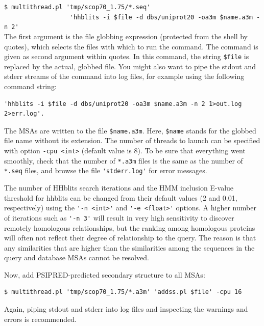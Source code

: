 \documentclass[11pt,a4paper]{article}
\begin{document}
\verb`$ multithread.pl 'tmp/scop70_1.75/*.seq' `\\
\verb`                  'hhblits -i $file -d dbs/uniprot20 -oa3m $name.a3m -n 2'`\\[-1mm]

The first argument is the file globbing expression (protected from the shell by quotes), which selects the files with which to run the command. The command is given as second argument within quotes. In this command, the string \verb`$file` is replaced by the actual, globbed file. You might also want to pipe the stdout and stderr streams of the command into log files, for example using the following command string:
{
\begin{verbatim}
'hhblits -i $file -d dbs/uniprot20 -oa3m $name.a3m -n 2 1>out.log 2>err.log'.
\end{verbatim}
}
The MSAs are written to the file \verb`$name.a3m`. Here, \verb`$name` stands for the globbed file name without its extension. The number of threads to launch can be specified with option \verb`-cpu <int>` (default value is 8). To be sure that everything went smoothly, check that the number of \verb`*.a3m` files is the same as the number of \verb`*.seq` files, and browse the file \verb`'stderr.log'` for error messages. 

The number of HHblits search iterations and the HMM inclusion E-value threshold for hhblits can be changed from their default values (2 and 0.01, respectively) using the \verb`'-n <int>'` and \verb`'-e <float>'` options. A higher number of iterations such as  \verb`'-n 3'` will result in very high sensitivity to discover remotely homologous relationships, but the ranking among homologous proteins will often not reflect their degree of relationship to the query. The reason is that any similarities that are higher than the similarities among the sequences in the query and database MSAs cannot be resolved. 

Now, add PSIPRED-predicted secondary structure to all MSAs:
\begin{verbatim}
$ multithread.pl 'tmp/scop70_1.75/*.a3m' 'addss.pl $file' -cpu 16 
\end{verbatim}
Again, piping stdout and stderr into log files and inspecting the warnings and errors is recommended. 
\end{document}
